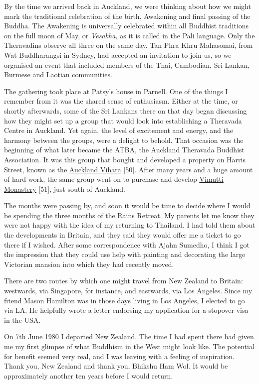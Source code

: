 By the time we arrived back in Auckland, we were thinking about how we
might mark the traditional celebration of the birth, Awakening and final
passing of the Buddha. The Awakening is universally celebrated within
all Buddhist traditions on the full moon of May, or \emph{Vesakha,} as
it is called in the Pali language. Only the Theravadins observe all
three on the same day. Tan Phra Khru Mahasomai, from Wat Buddharangsi in
Sydney, had accepted an invitation to join us, so we organised an event
that included members of the Thai, Cambodian, Sri Lankan, Burmese and
Laotian communities.

The gathering took place at Patsy's house in Parnell. One of the things
I remember from it was the shared sense of enthusiasm. Either at the
time, or shortly afterwards, some of the Sri Lankans there on that day
began discussing how they might set up a group that would look into
establishing a Theravada Centre in Auckland. Yet again, the level of
excitement and energy, and the harmony between the groups, were a
delight to behold. That occasion was the beginning of what later became
the ATBA, the Auckland Theravada Buddhist Association. It was this group
that bought and developed a property on Harris Street, known as the
\href{https://vimutti.org.nz/vimutti-2/atba/}{\underline{Auckland
Vihara}} {[}50{]}. After many years and a huge amount of hard work, the
same group went on to purchase and develop
\href{https://forestsangha.org/community/monasteries/vimutti-hermitage}{\underline{Vimutti
Monastery}} {[}51{]}, just south of Auckland.

The months were passing by, and soon it would be time to decide where I
would be spending the three months of the Rains Retreat. My parents let
me know they were not happy with the idea of my returning to Thailand. I
had told them about the developments in Britain, and they said they
would offer me a ticket to go there if I wished. After some
correspondence with Ajahn Sumedho, I think I got the impression that
they could use help with painting and decorating the large Victorian
mansion into which they had recently moved.

There are two routes by which one might travel from New Zealand to
Britain: westwards, via Singapore, for instance, and eastwards, via Los
Angeles. Since my friend Mason Hamilton was in those days living in Los
Angeles, I elected to go via LA. He helpfully wrote a letter endorsing
my application for a stopover visa in the USA.

On 7th June 1980 I departed New Zealand. The time I had spent there had
given me my first glimpse of what Buddhism in the West might look like.
The potential for benefit seemed very real, and I was leaving with a
feeling of inspiration. Thank you, New Zealand and thank you, Bhikshu
Ham Wol. It would be approximately another ten years before I would
return.


